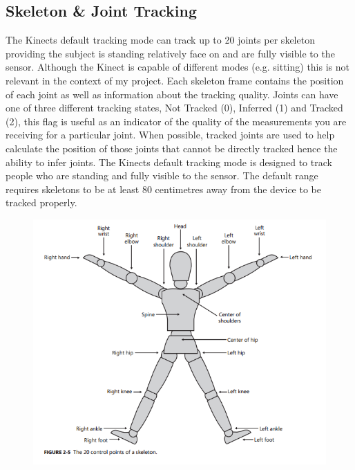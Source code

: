 \subsection{Skeleton \& Joint Tracking}
The Kinects default tracking mode can track up to 20 joints per skeleton providing the subject is standing relatively face on and are fully visible to the sensor. Although the Kinect is capable of different modes (e.g. sitting) this is not relevant in the context of my project.
Each skeleton frame contains the position of each joint as well as information about the tracking quality. Joints can have one of three different tracking states,  Not Tracked (0), Inferred (1) and Tracked (2), this flag is useful as an indicator of the quality of the measurements you are receiving for a particular joint. When possible, tracked joints are used to help calculate the position of those joints that cannot be directly tracked hence the ability to infer joints. The Kinects default tracking mode is designed to track people who are standing and fully visible to the sensor. The default range requires skeletons to be at least 80 centimetres away from the device to be tracked properly.

\begin{figure}[h]
    \centering
    \includegraphics[height=0.40\textheight]{fig02/kinSkel}
    \label{fig:kinskel}
\end{figure}



